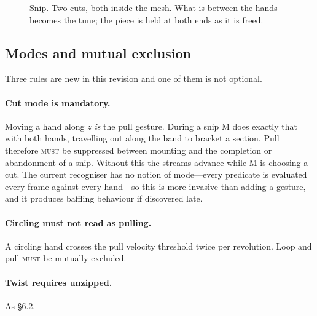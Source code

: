\documentclass[11pt,a4paper]{article}
\newcommand{\MUST}{\textsc{must}}
\theoremstyle{definition}
\theoremstyle{plain}
\theoremstyle{remark}
\newcommand{\spools}{%
  \fill[ribL,opacity=.45,rounded corners=2pt] (1.55,5.40) rectangle (2.45,5.95);
  \fill[ribR,opacity=.45,rounded corners=2pt] (5.55,5.40) rectangle (6.45,5.95);
  \node[font=\scriptsize] at (2,6.22) {left spool};
  \node[font=\scriptsize] at (6,6.22) {right spool};
}
\newcommand{\musician}{%
  \draw[gray] (4,-0.10) circle (0.23);
  \node[font=\scriptsize] at (4,-0.10) {M};
}
\newcommand{\axes}{%
  \draw[->,gray,thin] (0.85,4.30) -- (1.45,4.30) node[right,font=\scriptsize]{$x$};
  \draw[->,gray,thin] (0.85,4.30) -- (0.85,4.90) node[above,font=\scriptsize]{$z$};
}
\newcommand{\ribbonszipped}{%
  \draw[ribL,opacity=.45,line width=16pt,line join=round]
    (2,5.40) -- (2,4.60) -- (3.72,4.20) -- (3.72,2.20) -- (3.10,1.70) -- (3.10,0.70);
  \draw[ribR,opacity=.45,line width=16pt,line join=round]
    (6,5.40) -- (6,4.60) -- (4.28,4.20) -- (4.28,2.20) -- (4.90,1.70) -- (4.90,0.70);
}
\newcommand{\mesh}[2]{%
  \draw[gray!75,decorate,decoration={zigzag,segment length=5pt,amplitude=3pt}]
    (4,#1) -- (4,#2);
}
\newcommand{\mountclips}{%
  \fill[amb,opacity=.75,rounded corners=1pt] (3.76,1.05) rectangle (3.92,1.45);
  \fill[amb,opacity=.75,rounded corners=1pt] (4.08,1.05) rectangle (4.24,1.45);
}
\newcommand{\handat}[2]{\filldraw[fill=white,draw=gray!80,thin] (#1,#2) circle (0.17);}
\begin{document}
\begin{figure}[H]\centering
{}
\caption{Snip. Two cuts, both inside the mesh. What is between the hands becomes the tune; the
piece is held at both ends as it is freed.}
\end{figure}

\subsection{Modes and mutual exclusion}

Three rules are new in this revision and one of them is not optional.

\paragraph{Cut mode is mandatory.} Moving a hand along $z$ \emph{is} the pull gesture. During a
snip M does exactly that with both hands, travelling out along the band to bracket a section. Pull
therefore \MUST{} be suppressed between mounting and the completion or abandonment of a snip.
Without this the streams advance while M is choosing a cut. The current recogniser has no notion of
mode---every predicate is evaluated every frame against every hand---so this is more invasive than
adding a gesture, and it produces baffling behaviour if discovered late.

\paragraph{Circling must not read as pulling.} A circling hand crosses the pull velocity threshold
twice per revolution. Loop and pull \MUST{} be mutually excluded.

\paragraph{Twist requires unzipped.} As \S6.2.
\end{document}
